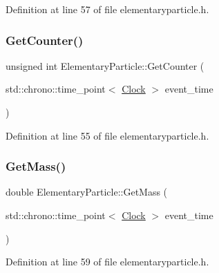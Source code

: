 Definition at line 57 of file elementaryparticle.\+h.

\mbox{\label{class_elementary_particle_a371b9b9bc520047c42d9e6d06b7f3dd9}} 
\subsubsection{\texorpdfstring{Get\+Counter()}{GetCounter()}}
{\footnotesize\ttfamily unsigned int Elementary\+Particle\+::\+Get\+Counter (\begin{DoxyParamCaption}\item[{std\+::chrono\+::time\+\_\+point$<$ \hyperlink{universe_8h_a0ef8d951d1ca5ab3cfaf7ab4c7a6fd80}{Clock} $>$}]{event\+\_\+time }\end{DoxyParamCaption})\hspace{0.3cm}{\ttfamily [inline]}}



Definition at line 55 of file elementaryparticle.\+h.

\mbox{\label{class_elementary_particle_a85400dc97f66c1ce23d9d961ddb6b8f3}} 
\subsubsection{\texorpdfstring{Get\+Mass()}{GetMass()}}
{\footnotesize\ttfamily double Elementary\+Particle\+::\+Get\+Mass (\begin{DoxyParamCaption}\item[{std\+::chrono\+::time\+\_\+point$<$ \hyperlink{universe_8h_a0ef8d951d1ca5ab3cfaf7ab4c7a6fd80}{Clock} $>$}]{event\+\_\+time }\end{DoxyParamCaption})\hspace{0.3cm}{\ttfamily [inline]}}



Definition at line 59 of file elementaryparticle.\+h.

\mbox{\label{class_elementary_particle_ad5f5a05770f94f4c8fee418d59098126}} 
